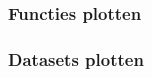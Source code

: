 \begin{frame}
  \frametitle{Functies plotten}
\end{frame}

\begin{frame}
  \frametitle{Datasets plotten}
\end{frame}
